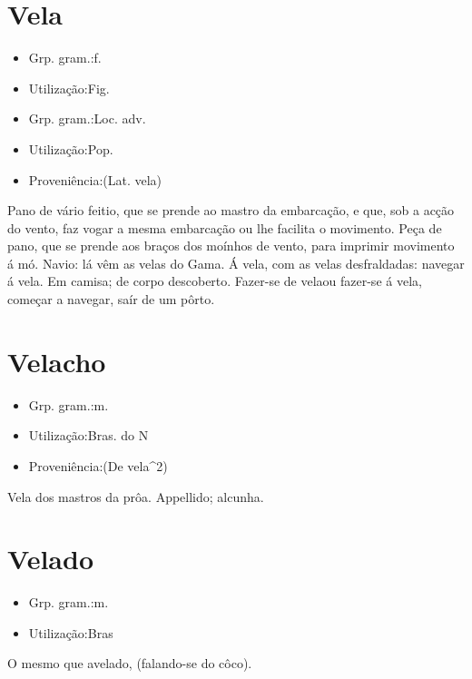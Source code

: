 \documentclass{article}
\begin{document}
\section{Vela}
\begin{itemize}
\item {Grp. gram.:f.}
\end{itemize}
\begin{itemize}
\item {Utilização:Fig.}
\end{itemize}
\begin{itemize}
\item {Grp. gram.:Loc. adv.}
\end{itemize}
\begin{itemize}
\item {Utilização:Pop.}
\end{itemize}
\begin{itemize}
\item {Proveniência:(Lat. \textunderscore vela\textunderscore )}
\end{itemize}
Pano de vário feitio, que se prende ao mastro da embarcação, e que, sob a acção do vento, faz vogar a mesma embarcação ou lhe facilita o movimento.
Peça de pano, que se prende aos braços dos moínhos de vento, para imprimir movimento á mó.
Navio: \textunderscore lá vêm as velas do Gama\textunderscore .
\textunderscore Á vela\textunderscore , com as velas desfraldadas: \textunderscore navegar á vela\textunderscore .
Em camisa; de corpo descoberto.
\textunderscore Fazer-se de vela\textunderscore  ou \textunderscore fazer-se á vela\textunderscore , começar a navegar, saír de um pôrto.
\section{Velacho}
\begin{itemize}
\item {Grp. gram.:m.}
\end{itemize}
\begin{itemize}
\item {Utilização:Bras. do N}
\end{itemize}
\begin{itemize}
\item {Proveniência:(De \textunderscore vela\textunderscore  ^2)}
\end{itemize}
Vela dos mastros da prôa.
Appellido; alcunha.
\section{Velado}
\begin{itemize}
\item {Grp. gram.:m.}
\end{itemize}
\begin{itemize}
\item {Utilização:Bras}
\end{itemize}
O mesmo que \textunderscore avelado\textunderscore , (falando-se do côco).
\end{document}
